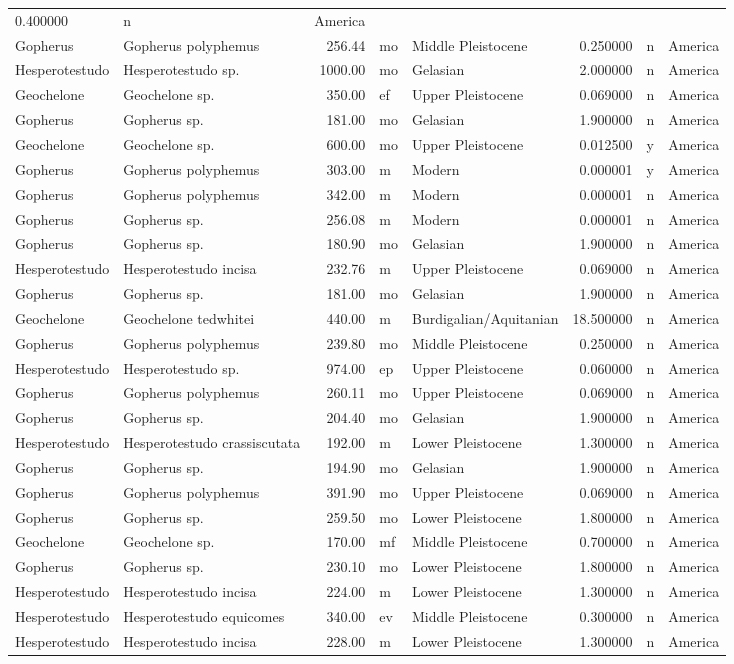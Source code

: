 \begin{landscape}
\begin{longtable}[]{@{}llrllrll@{}}
	0.400000 & n & America\tabularnewline
	Gopherus & Gopherus polyphemus & 256.44 & mo & Middle Pleistocene &
	0.250000 & n & America\tabularnewline
	Hesperotestudo & Hesperotestudo sp. & 1000.00 & mo & Gelasian & 2.000000
	& n & America\tabularnewline
	Geochelone & Geochelone sp. & 350.00 & ef & Upper Pleistocene & 0.069000
	& n & America\tabularnewline
	Gopherus & Gopherus sp. & 181.00 & mo & Gelasian & 1.900000 & n &
	America\tabularnewline
	Geochelone & Geochelone sp. & 600.00 & mo & Upper Pleistocene & 0.012500
	& y & America\tabularnewline
	Gopherus & Gopherus polyphemus & 303.00 & m & Modern & 0.000001 & y &
	America\tabularnewline
	Gopherus & Gopherus polyphemus & 342.00 & m & Modern & 0.000001 & n &
	America\tabularnewline
	Gopherus & Gopherus sp. & 256.08 & m & Modern & 0.000001 & n &
	America\tabularnewline
	Gopherus & Gopherus sp. & 180.90 & mo & Gelasian & 1.900000 & n &
	America\tabularnewline
	Hesperotestudo & Hesperotestudo incisa & 232.76 & m & Upper Pleistocene
	& 0.069000 & n & America\tabularnewline
	Gopherus & Gopherus sp. & 181.00 & mo & Gelasian & 1.900000 & n &
	America\tabularnewline
	Geochelone & Geochelone tedwhitei & 440.00 & m & Burdigalian/Aquitanian
	& 18.500000 & n & America\tabularnewline
	Gopherus & Gopherus polyphemus & 239.80 & mo & Middle Pleistocene &
	0.250000 & n & America\tabularnewline
	Hesperotestudo & Hesperotestudo sp. & 974.00 & ep & Upper Pleistocene &
	0.060000 & n & America\tabularnewline
	Gopherus & Gopherus polyphemus & 260.11 & mo & Upper Pleistocene &
	0.069000 & n & America\tabularnewline
	Gopherus & Gopherus sp. & 204.40 & mo & Gelasian & 1.900000 & n &
	America\tabularnewline
	Hesperotestudo & Hesperotestudo crassiscutata & 192.00 & m & Lower
	Pleistocene & 1.300000 & n & America\tabularnewline
	Gopherus & Gopherus sp. & 194.90 & mo & Gelasian & 1.900000 & n &
	America\tabularnewline
	Gopherus & Gopherus polyphemus & 391.90 & mo & Upper Pleistocene &
	0.069000 & n & America\tabularnewline
	Gopherus & Gopherus sp. & 259.50 & mo & Lower Pleistocene & 1.800000 & n
	& America\tabularnewline
	Geochelone & Geochelone sp. & 170.00 & mf & Middle Pleistocene &
	0.700000 & n & America\tabularnewline
	Gopherus & Gopherus sp. & 230.10 & mo & Lower Pleistocene & 1.800000 & n
	& America\tabularnewline
	Hesperotestudo & Hesperotestudo incisa & 224.00 & m & Lower Pleistocene
	& 1.300000 & n & America\tabularnewline
	Hesperotestudo & Hesperotestudo equicomes & 340.00 & ev & Middle
	Pleistocene & 0.300000 & n & America\tabularnewline
	Hesperotestudo & Hesperotestudo incisa & 228.00 & m & Lower Pleistocene
	& 1.300000 & n & America\tabularnewline

\end{longtable}
\end{landscape}
